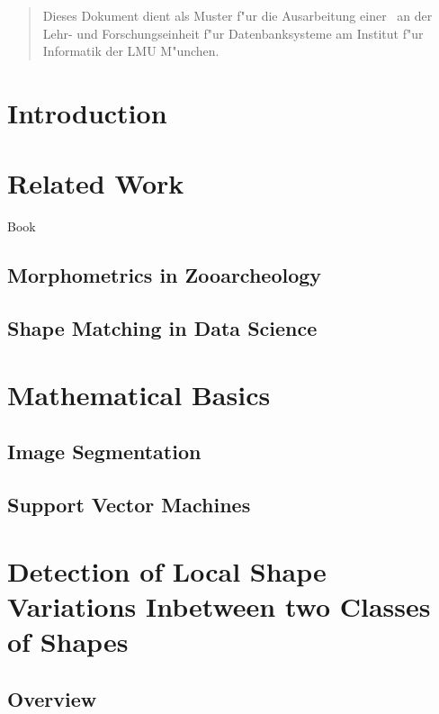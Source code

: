 \documentclass[pdftex,12pt,a4paper]{report}
\begin{document}
\deckblatt

\erklaerung

\begin{abstract}
Dieses Dokument dient als Muster f"ur die Ausarbeitung einer \the\arbeit\
an der Lehr- und Forschungseinheit f"ur Datenbanksysteme am Institut f"ur
Informatik der LMU M"unchen.
\end{abstract}

\tableofcontents

\chapter{Introduction}

\chapter{Related Work}

Book~\cite{da2010shape}

\section{Morphometrics in Zooarcheology}

\section{Shape Matching in Data Science}

\chapter{Mathematical Basics}

\section{Image Segmentation}

\section{Support Vector Machines}

\chapter{Detection of Local Shape Variations Inbetween two Classes of Shapes}

\section{Overview}
\end{document}
